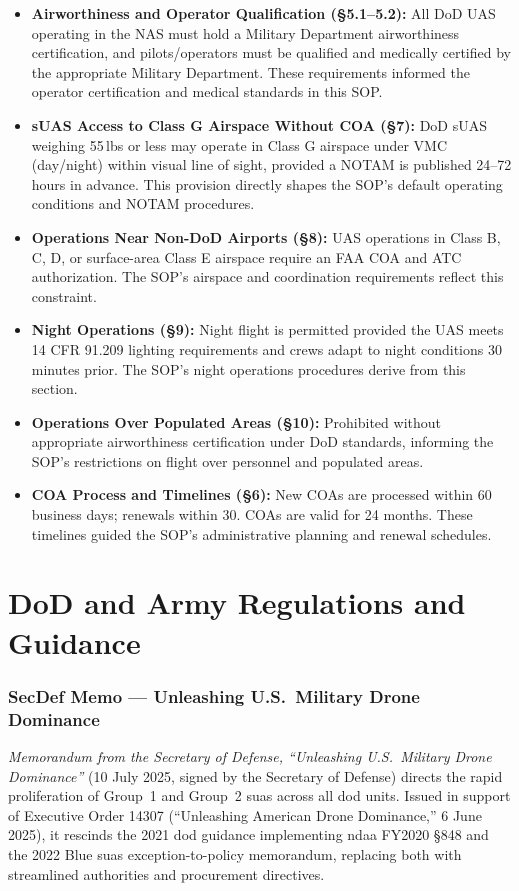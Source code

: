         \begin{itemize}
            \item \textbf{Airworthiness and Operator Qualification ({\S}5.1--5.2):} All DoD UAS operating in the NAS must hold a Military Department airworthiness certification, and pilots/operators must be qualified and medically certified by the appropriate Military Department.  These requirements informed the operator certification and medical standards in this SOP.
            \item \textbf{sUAS Access to Class G Airspace Without COA ({\S}7):} DoD sUAS weighing 55\,lbs or less may operate in Class G airspace under VMC (day/night) within visual line of sight, provided a NOTAM is published 24--72 hours in advance.  This provision directly shapes the SOP's default operating conditions and NOTAM procedures.
            \item \textbf{Operations Near Non-DoD Airports ({\S}8):} UAS operations in Class B, C, D, or surface-area Class E airspace require an FAA COA and ATC authorization.  The SOP's airspace and coordination requirements reflect this constraint.
            \item \textbf{Night Operations ({\S}9):} Night flight is permitted provided the UAS meets 14 CFR 91.209 lighting requirements and crews adapt to night conditions 30 minutes prior.  The SOP's night operations procedures derive from this section.
            \item \textbf{Operations Over Populated Areas ({\S}10):} Prohibited without appropriate airworthiness certification under DoD standards, informing the SOP's restrictions on flight over personnel and populated areas.
            \item \textbf{COA Process and Timelines ({\S}6):} New COAs are processed within 60 business days; renewals within 30.  COAs are valid for 24 months.  These timelines guided the SOP's administrative planning and renewal schedules.
        \end{itemize}

        \section{DoD and Army Regulations and Guidance}
        \subsubsection{SecDef Memo --- Unleashing U.S.\ Military Drone Dominance}
        \textit{Memorandum from the Secretary of Defense, ``Unleashing U.S.\ Military Drone Dominance''} (10 July 2025, signed by the Secretary of Defense) directs the rapid proliferation of Group~1 and Group~2 \ac{suas} across all \ac{dod} units. Issued in support of Executive Order 14307 (``Unleashing American Drone Dominance,'' 6 June 2025), it rescinds the 2021 \ac{dod} guidance implementing \ac{ndaa} FY2020 {\S}848 and the 2022 Blue \ac{suas} exception-to-policy memorandum, replacing both with streamlined authorities and procurement directives.

